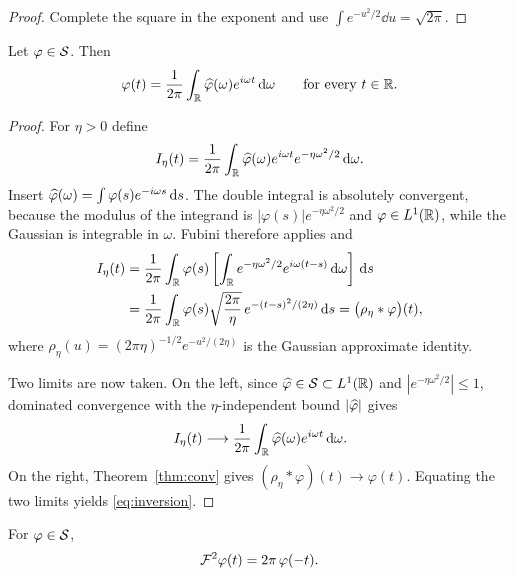 \begin{proof}
Complete the square in the exponent and use $\int e^{-u^{2}/2}\dd u=\sqrt{2\pi}$.
\end{proof}

\begin{theorem}\label{thm:inversion}
Let $\varphi\in\mathcal{S}$. Then
\begin{equation}
\varphi(t)=\frac{1}{2\pi}\int_{\mathbb{R}}\widehat{\varphi}(\omega)e^{i\omega t}\,\mathrm{d}\omega
\qquad\text{for every }t\in\mathbb{R} .
\label{eq:inversion}
\end{equation}
\end{theorem}

\begin{proof}
For $\eta>0$ define
\begin{equation}
I_{\eta}(t)=\frac{1}{2\pi}\int_{\mathbb{R}}\widehat{\varphi}(\omega)e^{i\omega t}e^{-\eta\omega^{2}/2}\,\mathrm{d}\omega .
\end{equation}
Insert $\widehat{\varphi}(\omega)=\int\varphi(s)e^{-i\omega s}\,\mathrm{d} s$. The double integral is absolutely convergent,
because the modulus of the integrand is $|\varphi(s)|e^{-\eta\omega^{2}/2}$ and $\varphi\in L^{1}(\mathbb{R})$,
while the Gaussian is integrable in $\omega$. Fubini therefore applies and
\begin{align}
I_{\eta}(t)
&=\frac{1}{2\pi}\int_{\mathbb{R}}\varphi(s)\left[\int_{\mathbb{R}}e^{-\eta\omega^{2}/2}e^{i\omega(t-s)}\,\mathrm{d}\omega
\right]\,\mathrm{d} s \notag\\
&=\frac{1}{2\pi}\int_{\mathbb{R}}\varphi(s)\sqrt{\frac{2\pi}{\eta}}\,e^{-(t-s)^{2}/(2\eta)}\,\mathrm{d} s
=\big(\rho_{\eta}*\varphi\big)(t),
\label{eq:conv}
\end{align}
where $\rho_{\eta}(u)=(2\pi\eta)^{-1/2}e^{-u^{2}/(2\eta)}$ is the Gaussian approximate identity.

Two limits are now taken. On the left, since $\widehat{\varphi}\in\mathcal{S}\subset L^{1}(\mathbb{R})$ and
$|e^{-\eta\omega^{2}/2}|\le1$, dominated convergence with the $\eta$-independent bound $|\widehat{\varphi}|$ gives
\begin{equation}
I_{\eta}(t)\longrightarrow\frac{1}{2\pi}\int_{\mathbb{R}}\widehat{\varphi}(\omega)e^{i\omega t}\,\mathrm{d}\omega .
\end{equation}
On the right, Theorem~\ref{thm:conv} gives $(\rho_{\eta}*\varphi)(t)\to\varphi(t)$. Equating the two
limits yields \eqref{eq:inversion}.
\end{proof}

\begin{theorem}\label{thm:F2}
For $\varphi\in\mathcal{S}$,
\begin{equation}
\mathcal{F}^{2}\varphi(t)=2\pi\,\varphi(-t).
\label{eq:F2}
\end{equation}
\end{theorem}

